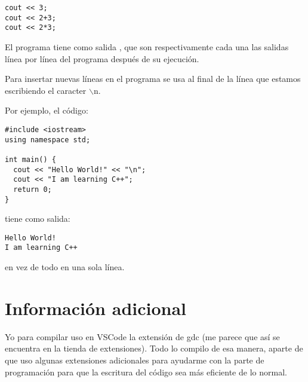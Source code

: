 \documentclass[12pt]{report}
\newcounter{it}
\theoremstyle{largebreak}
\newcommand{\code}[1]{{\fontfamily{cmtt}\selectfont #1}}
\begin{document}
    \begin{lstlisting}[caption = Operaciones dentro de \code{cout}]
cout << 3;
cout << 2+3;
cout << 2*3;
    \end{lstlisting}
    El programa tiene como salida \code{356}, que son respectivamente cada una las salidas línea por línea del programa después de su ejecución.

    Para insertar nuevas líneas en el programa se usa al final de la línea que estamos escribiendo el caracter \code{$\backslash$n}.

    Por ejemplo, el código:

    \begin{lstlisting}
#include <iostream>
using namespace std;

int main() {
  cout << "Hello World!" << "\n";
  cout << "I am learning C++";
  return 0;
}
    \end{lstlisting}
    tiene como salida:
    \begin{lstlisting}
Hello World!
I am learning C++
    \end{lstlisting}
    en vez de todo en una sola línea.

    \chapter*{Información adicional}

    Yo para compilar uso en VSCode la extensión de gdc (me parece que así se encuentra en la tienda de extensiones). Todo lo compilo de esa manera, aparte de que uso algunas extensiones adicionales para ayudarme con la parte de programación para que la escritura del código sea más eficiente de lo normal.
\end{document}
